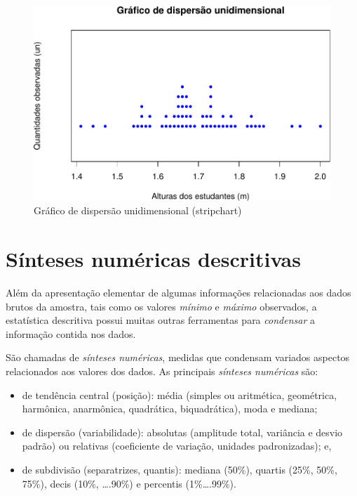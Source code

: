 \documentclass[
]{book}
\providecommand{\tightlist}{%
  \setlength{\itemsep}{0pt}\setlength{\parskip}{0pt}}
\begin{document}
\begin{figure}

{\centering \includegraphics{apostila_files/figure-latex/unnamed-chunk-18-1} 

}

\caption{Gráfico de dispersão unidimensional (stripchart)}\label{fig:unnamed-chunk-18}
\end{figure}

\hypertarget{suxednteses-numuxe9ricas-descritivas}{%
\section{Sínteses numéricas descritivas}\label{suxednteses-numuxe9ricas-descritivas}}

\hfill\break

Além da apresentação elementar de algumas informações relacionadas aos dados brutos da amostra, tais como os valores \emph{mínimo} e \emph{máximo} observados, a estatística descritiva possui muitas outras ferramentas para \emph{condensar} a informação contida nos dados.

\hfill\break

São chamadas de \emph{sínteses numéricas}, medidas que condensam variados aspectos relacionados aos valores dos dados. As principais \emph{sínteses numéricas} são:

\hfill\break

\begin{itemize}
\tightlist
\item
  de tendência central (posição): média (simples ou aritmética, geométrica, harmônica, anarmônica, quadrática, biquadrática), moda e mediana;
\item
  de dispersão (variabilidade): absolutas (amplitude total, variância e desvio padrão) ou relativas (coeficiente de variação, unidades padronizadas); e,
\item
  de subdivisão (separatrizes, quantis): mediana (50\%), quartis (25\%, 50\%, 75\%), decis (10\%, \ldots.90\%) e percentis (1\%\ldots.99\%).
\end{itemize}
\end{document}
